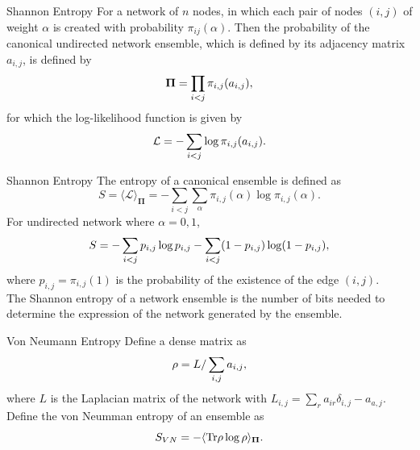 \documentclass[t,aspectratio=169,usepdftitle=false]{beamer}
\begin{document}
  \begin{frame}{Shannon Entropy}
    For a network of $n$ nodes, in which each pair of nodes $(i,j)$ of weight $\alpha$ is created with probability 
    $\pi_{ij}(\alpha)$. Then the probability of the canonical undirected network ensemble, which is defined by its 
    adjacency matrix ${a_{i,j}}$, is defined by
    \begin{equation}
      \mathbf{\Pi} = \prod_{i < j} \pi_{i,j} (a_{i,j}),  \notag
    \end{equation}
    for which the log-likelihood function is given by
    \begin{equation}
      \mathcal{L} = - \sum_{i < j} \log \pi_{i,j}(a_{i,j}).  \notag
    \end{equation}
  \end{frame}

  \begin{frame}{Shannon Entropy}
    The entropy of a canonical ensemble is defined as
    \begin{equation}
      S = \langle \mathcal{L} \rangle_{\mathbf{\Pi}} = - \sum_{i < j} \sum_{\alpha} \pi_{i,j}(\alpha) \log \pi_{i,j}(\alpha).
    \end{equation}
    For undirected network where $\alpha=0,1$,
    \begin{equation}
      S = - \sum_{i < j} p_{i,j} \log p_{i,j} - \sum_{i < j} (1-p_{i,j}) \log (1-p_{i,j}),  \notag
    \end{equation}
    where $p_{i,j}=\pi_{i,j}(1)$ is the probability of the existence of the edge $(i,j)$. \\
    \vspace{0.2cm}
    \alert{The Shannon entropy of a network ensemble is the number of bits needed to determine the expression of 
    the network generated by the ensemble.}
  \end{frame}

  \begin{frame}{Von Neumann Entropy}
    Define a dense matrix as
    \begin{equation}
      \rho = L / \sum_{i,j} a_{i,j},  \notag
    \end{equation}
    where $L$ is the Laplacian matrix of the network with $L_{i,j} = \sum_{r} a_{ir} \delta_{i,j} - a_{a,j}$. \\
    \vspace{0.2cm}
    Define the von Neumman entropy of an ensemble as
    \begin{equation}
      S_{VN} = - \langle {\rm Tr} \rho \log \rho \rangle_{\mathbf{\Pi}}.
    \end{equation}
  \end{frame}
\end{document}
